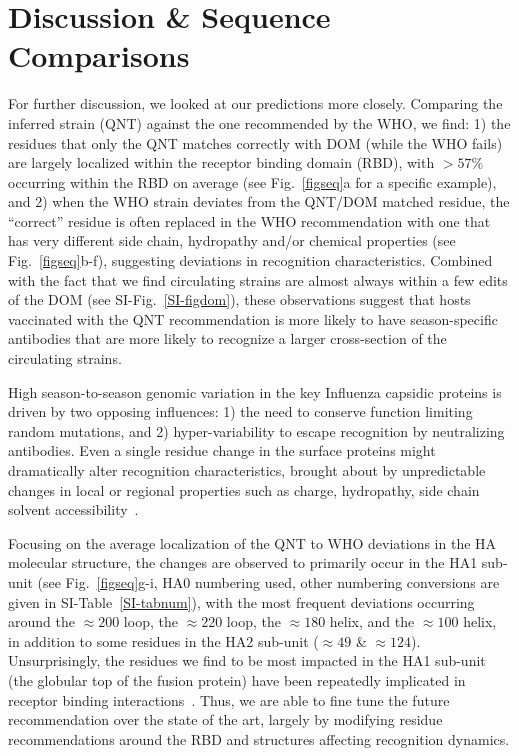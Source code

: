 \documentclass[onecolumn, compsoc,10pt]{IEEEtran}
\begin{document}
 

\section*{Discussion \& Sequence Comparisons}

For further discussion, we looked at our \qnet predictions more closely. Comparing the \qnet inferred strain (QNT) against the one recommended by the WHO, we find: 1) the residues that only the QNT matches correctly with DOM (while the WHO fails) are largely localized within the receptor binding domain (RBD), with $>57\%$ occurring within  the RBD on average (see Fig.~\ref{figseq}a for a specific example), and 2) when the WHO strain deviates from  the QNT/DOM  matched residue, the ``correct'' residue is often replaced in the WHO recommendation with one that has very different side chain, hydropathy  and/or chemical properties (see Fig.~\ref{figseq}b-f), suggesting deviations in recognition characteristics. Combined with the fact that we find circulating strains are almost always within a few edits of the DOM (see SI-Fig.~\ref{SI-figdom}), these observations suggest that hosts vaccinated with the QNT recommendation is more likely to have season-specific antibodies that are more likely to recognize a larger cross-section of the circulating strains.

High season-to-season genomic variation in the key  Influenza capsidic proteins is driven by two opposing influences: 1) the need to conserve function  limiting random mutations, and 2) hyper-variability to escape recognition by neutralizing antibodies. Even a  single residue change in the surface proteins might dramatically alter recognition characteristics, brought about by unpredictable~\cite{carugo2001normalized,righetto2014comparative} changes in local or regional properties such as charge, hydropathy, side chain solvent accessibility~\cite{lee1971interpretation,shrake1973environment,momen2008impact,adamczak2005combining}.

Focusing on the average localization of the QNT to WHO deviations in the HA molecular  structure, the changes are observed to primarily occur in the HA1 sub-unit (see Fig.~\ref{figseq}g-i, HA0 numbering used, other numbering conversions are given in SI-Table~\ref{SI-tabnum}), with the most frequent deviations  occurring around the $\approx 200$ loop, the $\approx 220$ loop, the $\approx 180$ helix, and the $\approx 100$ helix, in addition to some residues in the HA2 sub-unit ($\approx 49$ \& $\approx 124$). Unsurprisingly, the residues we find to be most impacted in the HA1 sub-unit (the globular top of the fusion protein) have been repeatedly implicated in receptor binding interactions~\cite{tzarum2015structure,lazniewski2018structural,garcia2015dynamic}. Thus, we are able to fine tune the future recommendation over the state of the art, largely by modifying residue recommendations around the RBD and  structures affecting recognition dynamics.
\end{document}
